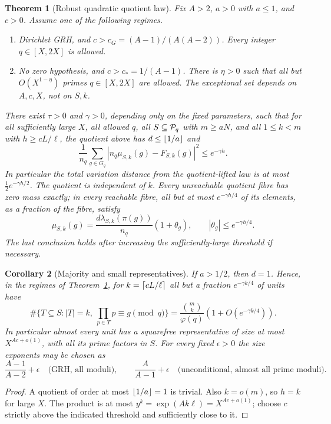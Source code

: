 \documentclass[11pt]{article}
\newtheorem{theorem}{Theorem}[section]
\newtheorem{corollary}[theorem]{Corollary}
\theoremstyle{remark}\newtheorem{remark}[theorem]{Remark}
\begin{document}
\begin{theorem}[Robust quadratic quotient law]\label{thm:main}
Fix $A>2$, $a>0$ with $a\le1$, and $c>0$. Assume one of the following regimes.
\begin{enumerate}
\item Dirichlet GRH, and $c>c_G=(A-1)/(A(A-2))$. Every integer $q\in[X,2X]$ is allowed.
\item No zero hypothesis, and $c>c_*=1/(A-1)$. There is $\eta>0$ such that all but $O(X^{1-\eta})$ primes $q\in[X,2X]$ are allowed. The exceptional set depends on $A,c,X$, not on $S,k$.
\end{enumerate}
There exist $\tau>0$ and $\gamma>0$, depending only on the fixed parameters, such that for all sufficiently large $X$, all allowed $q$, all $S\subseteq\mathcal P_q$ with $m\ge aN$, and all $1\le k<m$ with $h\ge c L/\ell$, the quotient above has $d\le\lfloor1/a\rfloor$ and
\begin{equation}\label{eq:main}
 \frac1{n_q}\sum_{g\in G_q}\left|n_q\mu_{S,k}(g)-F_{S,k}(g)\right|^2\le e^{-\gamma h}.
\end{equation}
In particular the total variation distance from the quotient-lifted law is at most $\tfrac12 e^{-\gamma h/2}$. The quotient is independent of $k$. Every unreachable quotient fibre has zero mass exactly; in every reachable fibre, all but at most $e^{-\gamma h/4}$ of its elements, as a fraction of the fibre, satisfy
\begin{equation}\label{eq:relative}
 \mu_{S,k}(g)=\frac{d\lambda_{S,k}(\pi(g))}{n_q}(1+\theta_g),\qquad
 |\theta_g|\le e^{-\gamma h/4}.
\end{equation}
The last conclusion holds after increasing the sufficiently-large threshold if necessary.
\end{theorem}

\begin{corollary}[Majority and small representatives]\label{cor:majority}
If $a>1/2$, then $d=1$. Hence, in the regimes of Theorem~\ref{thm:main}, for $k=\lceil cL/\ell\rceil$ all but a fraction $e^{-\gamma k/4}$ of units have
\[
 \#\{T\subseteq S: |T|=k,\ \prod_{p\in T}p\equiv g\pmod q\}
 =\frac{\binom{m}{k}}{\varphi(q)}(1+O(e^{-\gamma k/4})).
\]
In particular almost every unit has a squarefree representative of size at most $X^{Ac+o(1)}$, with all its prime factors in $S$. For every fixed $\epsilon>0$ the size exponents may be chosen as
\[
 \frac{A-1}{A-2}+\epsilon\quad\text{(GRH, all moduli)},\qquad
 \frac A{A-1}+\epsilon\quad\text{(unconditional, almost all prime moduli)}.
\]
\end{corollary}
\begin{proof}
A quotient of order at most $\lfloor1/a\rfloor=1$ is trivial. Also $k=o(m)$, so $h=k$ for large $X$. The product is at most $y^k=\exp(Ak\ell)=X^{Ac+o(1)}$; choose $c$ strictly above the indicated threshold and sufficiently close to it.
\end{proof}
\end{document}

